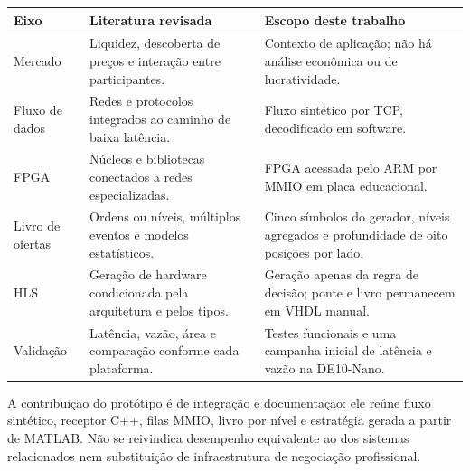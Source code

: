 \begin{tabframed}[htb]
\caption{Relação entre a literatura e o escopo do protótipo}
\label{quad:comparacaoRelacionados}
\begin{tabularx}{\textwidth}{lXX}
\toprule
\textbf{Eixo} & \textbf{Literatura revisada} & \textbf{Escopo deste trabalho} \\ \midrule
Mercado & Liquidez, descoberta de preços e interação entre participantes. & Contexto de aplicação; não há análise econômica ou de lucratividade. \\
Fluxo de dados & Redes e protocolos integrados ao caminho de baixa latência. & Fluxo sintético por TCP, decodificado em software. \\
FPGA & Núcleos e bibliotecas conectados a redes especializadas. & FPGA acessada pelo ARM por MMIO em placa educacional. \\
Livro de ofertas & Ordens ou níveis, múltiplos eventos e modelos estatísticos. & Cinco símbolos do gerador, níveis agregados e profundidade de oito posições por lado. \\
HLS & Geração de hardware condicionada pela arquitetura e pelos tipos. & Geração apenas da regra de decisão; ponte e livro permanecem em VHDL manual. \\
Validação & Latência, vazão, área e comparação conforme cada plataforma. & Testes funcionais e uma campanha inicial de latência e vazão na DE10-Nano. \\ \bottomrule
\end{tabularx}
\end{tabframed}

A contribuição do protótipo é de integração e documentação: ele reúne fluxo sintético, receptor C++, filas MMIO, livro por nível e estratégia gerada a partir de MATLAB. Não se reivindica desempenho equivalente ao dos sistemas relacionados nem substituição de infraestrutura de negociação profissional.
